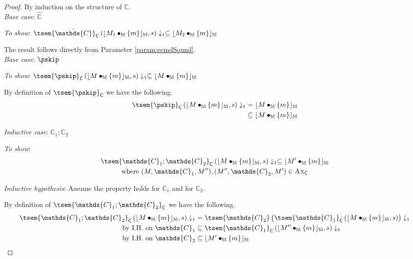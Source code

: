 {\parindent0pt
\begin{proof}
By induction on the structure of $\mathds{C}$. \\

\textit{Base case}: $\mathds{\hat{C}}$

\textit{To show}: $\tsem{\hat{\mathds{C}}}_\mathsf{C} \left( \lfloor M_1 \bullet_\mathbb{M} \{m\} \rfloor_\mathbb{M}, s \right) \downarrow_1 \subseteq \lfloor M_2 \bullet_\mathbb{M} \{m\} \rfloor_\mathbb{M}$

The result follows directly from Parameter \ref{param:ecmdSound}. \\

\textit{Base case}: $\pskip$

\textit{To show}: $\tsem{\pskip}_\mathsf{C} \left( \lfloor M \bullet_\mathbb{M} \{m\} \rfloor_\mathbb{M}, s \right) \downarrow_1 \subseteq \lfloor M \bullet_\mathbb{M} \{m\} \rfloor_\mathbb{M}$

By definition of $\tsem{\pskip}_\mathsf{C}$ we have the following.
\begin{align*}
	\tsem{\pskip}_\mathsf{C} \left( \lfloor M \bullet_\mathbb{M} \{m\} \rfloor_\mathbb{M}, s \right) \downarrow_1
	&=
	\lfloor M \bullet_\mathbb{M} \{m\} \rfloor_\mathbb{M}
	\\
	&\subseteq \lfloor M \bullet_\mathbb{M} \{m\} \rfloor_\mathbb{M}
\end{align*} 

\textit{Inductive case}: $\mathds{C}_1 ; \mathds{C}_2$

\textit{To show}:
\begin{gather*}
	\tsem{\mathds{C}_1 ; \mathds{C}_2}_\mathsf{C} \left( \lfloor M \bullet_\mathbb{M} \{m\} \rfloor_\mathbb{M}, s \right) \downarrow_1 \subseteq \lfloor M' \bullet_\mathbb{M} \{m\} \rfloor_\mathbb{M}
	\\
	\text{where } (M, \mathds{C}_1, M''), (M'', \mathds{C}_2, M') \in \textsc{Ax}_\mathsf{C}
\end{gather*}

\textit{Inductive hypothesis}: Assume the property holds for $\mathds{C}_1$ and for $\mathds{C}_2$.

By definition of $\tsem{\mathds{C}_1 ; \mathds{C}_2}_\mathsf{C}$ we have the following.
\begin{align*}
	\tsem{\mathds{C}_1 ; \mathds{C}_2}_\mathsf{C} \left( \lfloor M \bullet_\mathbb{M} \{m\} \rfloor_\mathbb{M}, s \right) \downarrow_1
	&=
	\tsem{\mathds{C}_2}\left( \tsem{\mathds{C}_1}_\mathsf{C} \left( \lfloor M \bullet_\mathbb{M} \{m\}\rfloor_\mathbb{M}, s \right) \right) \downarrow_1 \\
	\text{by I.H. on } \mathds{C}_1 &\subseteq
	\tsem{\mathds{C}_1}_\mathsf{C} \left( \lfloor M'' \bullet_\mathbb{M} \{m\} \rfloor_\mathbb{M}, s \right) \downarrow_1 \\
	\text{by I.H. on } \mathds{C}_2 &\subseteq
	\lfloor M' \bullet_\mathbb{M} \{m\} \rfloor_\mathbb{M}
\end{align*}


\end{proof}}
